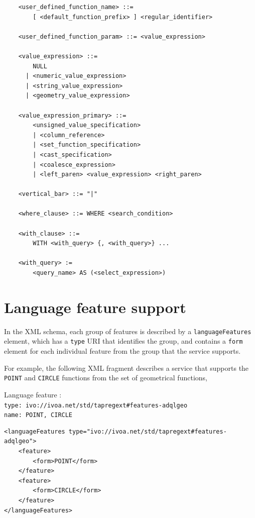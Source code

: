 \documentclass[11pt,a4paper]{ivoa}
\begin{document}
\begin{verbatim}
    <user_defined_function_name> ::=
        [ <default_function_prefix> ] <regular_identifier>

    <user_defined_function_param> ::= <value_expression>

    <value_expression> ::=
        NULL
      | <numeric_value_expression>
      | <string_value_expression>
      | <geometry_value_expression>

    <value_expression_primary> ::=
        <unsigned_value_specification>
        | <column_reference>
        | <set_function_specification>
        | <cast_specification>
        | <coalesce_expression>
        | <left_paren> <value_expression> <right_paren>

    <vertical_bar> ::= "|"

    <where_clause> ::= WHERE <search_condition>

    <with_clause> ::=
        WITH <with_query> {, <with_query>} ...

    <with_query> :=
        <query_name> AS (<select_expression>)

\end{verbatim}

\clearpage %
\section{Language feature support}
\label{sec:features}

In the \TAPRegSpec{} XML schema, each group of features is
described by a \verb:languageFeatures: element, which has a \verb:type:
URI that identifies the group, and contains a \verb:form: element for each
individual feature from the group that the service supports.

For example, the following XML fragment describes a service that supports the
\verb:POINT: and \verb:CIRCLE: functions from the set of geometrical functions,

{\footnotesize Language feature :}\\
{\footnotesize \verb|type: ivo://ivoa.net/std/tapregext#features-adqlgeo|}\\
{\footnotesize \verb|name: POINT, CIRCLE|}\\

\begin{verbatim}
<languageFeatures type="ivo://ivoa.net/std/tapregext#features-adqlgeo">
    <feature>
        <form>POINT</form>
    </feature>
    <feature>
        <form>CIRCLE</form>
    </feature>
</languageFeatures>    
\end{verbatim}
\end{document}

